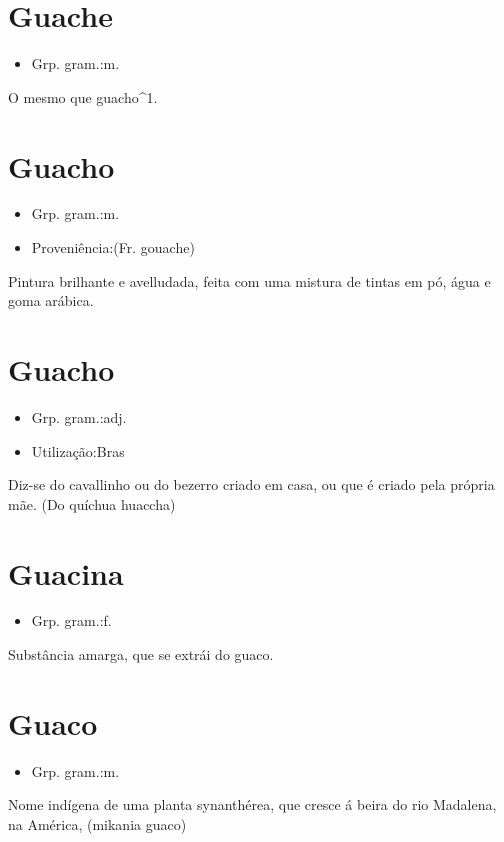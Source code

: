 \section{Guache}
\begin{itemize}
\item {Grp. gram.:m.}
\end{itemize}
O mesmo que \textunderscore guacho\textunderscore ^1.
\section{Guacho}
\begin{itemize}
\item {Grp. gram.:m.}
\end{itemize}
\begin{itemize}
\item {Proveniência:(Fr. \textunderscore gouache\textunderscore )}
\end{itemize}
Pintura brilhante e avelludada, feita com uma mistura de tintas em pó, água e goma arábica.
\section{Guacho}
\begin{itemize}
\item {Grp. gram.:adj.}
\end{itemize}
\begin{itemize}
\item {Utilização:Bras}
\end{itemize}
Diz-se do cavallinho ou do bezerro criado em casa, ou que é criado pela própria mãe.
(Do quíchua \textunderscore huaccha\textunderscore )
\section{Guacina}
\begin{itemize}
\item {Grp. gram.:f.}
\end{itemize}
Substância amarga, que se extrái do guaco.
\section{Guaco}
\begin{itemize}
\item {Grp. gram.:m.}
\end{itemize}
Nome indígena de uma planta synanthérea, que cresce á beira do rio Madalena, na América, (\textunderscore mikania guaco\textunderscore )
